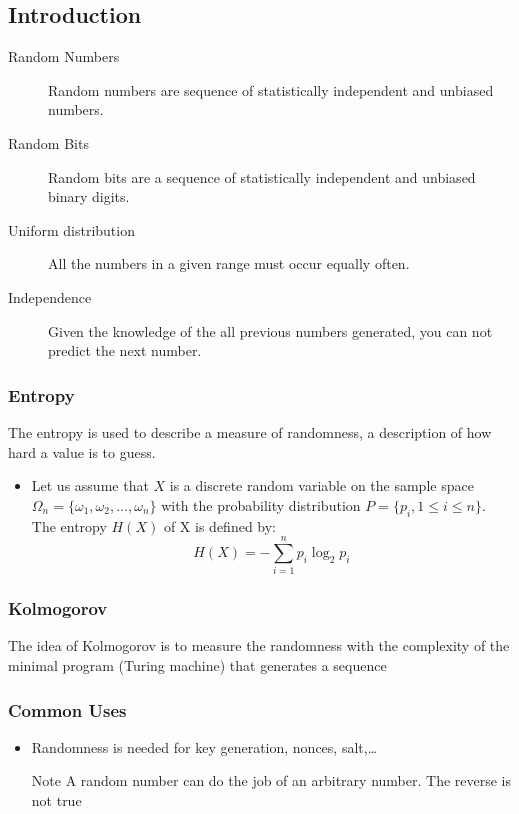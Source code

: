 \subsection{Introduction}
\begin{description}
    \item[Random Numbers] Random numbers are sequence of statistically
        independent and unbiased numbers.
    \item[Random Bits] Random bits are a sequence of statistically independent
        and unbiased binary digits.
    \item[Uniform distribution] All the numbers in a given range must occur
        equally often.
    \item[Independence] Given the knowledge of the all previous numbers
        generated, you can not predict the next number.
\end{description}

\subsubsection{Entropy}
The entropy is used to describe a measure of randomness, a description
of how hard a value is to guess.

\begin{itemize}
    \item Let us assume that $X$ is a discrete random variable on the sample
        space $ \Omega_n = \{\omega_1,\omega_2,\ldots,\omega_n\} $ with the
        probability distribution $P=\{ p_i,1 \leq i \leq n \}$. The entropy $H(X)$
        of X is defined by:
        $$ H(X)= - \sum_{i=1}^{n} p_i \log_{2}p_i $$
\end{itemize}

\subsubsection{Kolmogorov}
The idea of Kolmogorov is to measure the randomness with the
complexity of the minimal program (Turing machine) that
generates a sequence

\subsubsection{Common Uses} 
\begin{itemize} 
    \item Randomness is needed for key generation, nonces, salt,\ldots
    \item[Note] A random number can do the job of an arbitrary number. The
        reverse is not true
\end{itemize}

